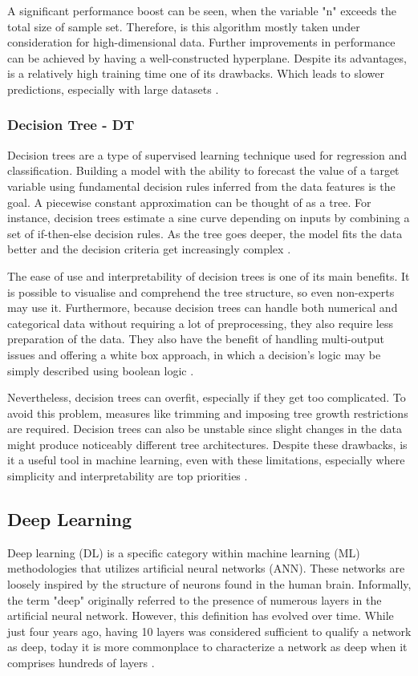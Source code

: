 A significant performance boost can be seen, when the variable "n" exceeds the total size of sample set. Therefore, is this algorithm mostly taken under consideration for high-dimensional data. Further improvements in performance can be achieved by having a well-constructed hyperplane. Despite its advantages, is a relatively high training time one of its drawbacks. Which leads to slower predictions, especially with large datasets \citep{sen_supervised_2020}.

\subsubsection{Decision Tree - DT}

Decision trees are a type of supervised learning technique used for regression and classification. Building a model with the ability to forecast the value of a target variable using fundamental decision rules inferred from the data features is the goal. A piecewise constant approximation can be thought of as a tree. For instance, decision trees estimate a sine curve depending on inputs by combining a set of if-then-else decision rules. As the tree goes deeper, the model fits the data better and the decision criteria get increasingly complex \citep{sklearn_dtt}.

The ease of use and interpretability of decision trees is one of its main benefits. It is possible to visualise and comprehend the tree structure, so even non-experts may use it. Furthermore, because decision trees can handle both numerical and categorical data without requiring a lot of preprocessing, they also require less preparation of the data. They also have the benefit of handling multi-output issues and offering a white box approach, in which a decision's logic may be simply described using boolean logic \citep{sklearn_dtt}.

Nevertheless, decision trees can overfit, especially if they get too complicated. To avoid this problem, measures like trimming and imposing tree growth restrictions are required. Decision trees can also be unstable since slight changes in the data might produce noticeably different tree architectures. Despite these drawbacks, is it a useful tool in machine learning, even with these limitations, especially where simplicity and interpretability are top priorities \citep{sklearn_dtt}.


\subsection{Deep Learning}
Deep learning (DL) is a specific category within machine learning (ML) methodologies that utilizes artificial neural networks (ANN). These networks are loosely inspired by the structure of neurons found in the human brain. Informally, the term "deep" originally referred to the presence of numerous layers in the artificial neural network. However, this definition has evolved over time. While just four years ago, having 10 layers was considered sufficient to qualify a network as deep, today it is more commonplace to characterize a network as deep when it comprises hundreds of layers \citep{gulli_deep_2017}. 

